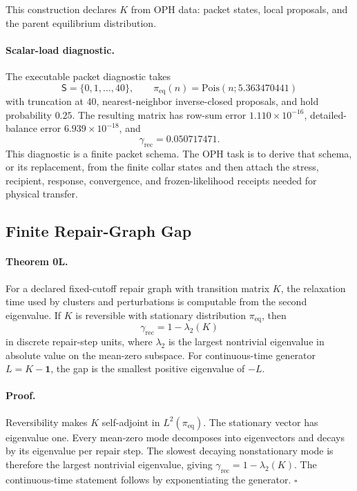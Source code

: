 \documentclass[11pt]{article}
\begin{document}
This construction declares \(K\) from OPH data: packet states, local proposals,
and the parent equilibrium distribution.

\paragraph{Scalar-load diagnostic.}
The executable packet diagnostic takes
\[
  \mathsf S=\{0,1,\ldots,40\},
  \qquad
  \pi_{\mathrm{eq}}(n)=
  \mathrm{Pois}\!\left(n;5.363470441\right)
\]
with truncation at \(40\), nearest-neighbor inverse-closed proposals, and
hold probability \(0.25\).  The resulting matrix has row-sum error
\(1.110\times10^{-16}\), detailed-balance error \(6.939\times10^{-18}\), and
\[
  \gamma_{\mathrm{rec}}=0.050717471.
\]
This diagnostic is a finite packet schema.  The OPH task is to derive that
schema, or its replacement, from the finite collar states and then attach the
stress, recipient, response, convergence, and frozen-likelihood receipts needed
for physical transfer.

\subsection{Finite Repair-Graph Gap}

\paragraph{Theorem 0L.}
For a declared fixed-cutoff repair graph with transition matrix \(K\), the
relaxation time used by clusters and perturbations is computable from the
second eigenvalue.  If \(K\) is reversible with stationary distribution
\(\pi_{\mathrm{eq}}\), then
\begin{equation}
  \gamma_{\mathrm{rec}}=1-\lambda_2(K)
\end{equation}
in discrete repair-step units, where \(\lambda_2\) is the largest nontrivial
eigenvalue in absolute value on the mean-zero subspace.  For continuous-time
generator \(L=K-\mathbf 1\), the gap is the smallest positive eigenvalue of
\(-L\).

\paragraph{Proof.}
Reversibility makes \(K\) self-adjoint in
\(L^2(\pi_{\mathrm{eq}})\).  The stationary vector has eigenvalue one.  Every
mean-zero mode decomposes into eigenvectors and decays by its eigenvalue per
repair step.  The slowest decaying nonstationary mode is therefore the largest
nontrivial eigenvalue, giving \(\gamma_{\mathrm{rec}}=1-\lambda_2(K)\).  The
continuous-time statement follows by exponentiating the generator. \(\square\)
\end{document}
